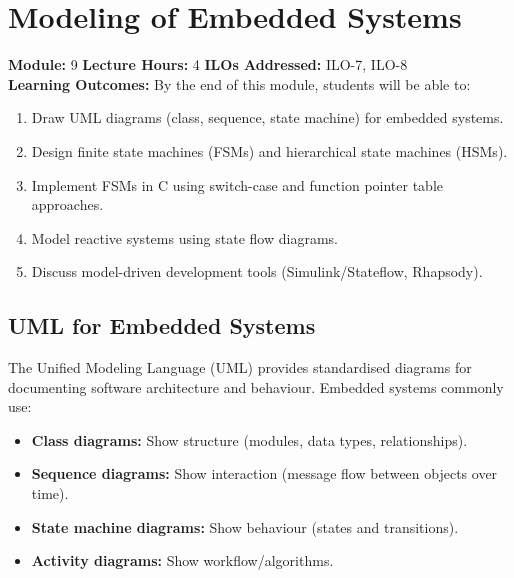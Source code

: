 
\chapter{Modeling of Embedded Systems}
\label{ch:modeling}

\begin{moduleinfo}
  \textbf{Module:} 9 \quad
  \textbf{Lecture Hours:} 4 \quad
  \textbf{ILOs Addressed:} ILO-7, ILO-8 \\[4pt]
  \textbf{Learning Outcomes:} By the end of this module, students will be able to:
  \begin{enumerate}[nosep]
    \item Draw UML diagrams (class, sequence, state machine) for embedded systems.
    \item Design finite state machines (FSMs) and hierarchical state machines (HSMs).
    \item Implement FSMs in C using switch-case and function pointer table approaches.
    \item Model reactive systems using state flow diagrams.
    \item Discuss model-driven development tools (Simulink/Stateflow, Rhapsody).
  \end{enumerate}
\end{moduleinfo}

\section{UML for Embedded Systems}
\label{sec:mod:uml}

The Unified Modeling Language (UML) provides standardised diagrams for documenting software architecture and behaviour. Embedded systems commonly use:

\begin{itemize}[nosep]
  \item \textbf{Class diagrams:} Show structure (modules, data types, relationships).
  \item \textbf{Sequence diagrams:} Show interaction (message flow between objects over time).
  \item \textbf{State machine diagrams:} Show behaviour (states and transitions).
  \item \textbf{Activity diagrams:} Show workflow/algorithms.
\end{itemize}

